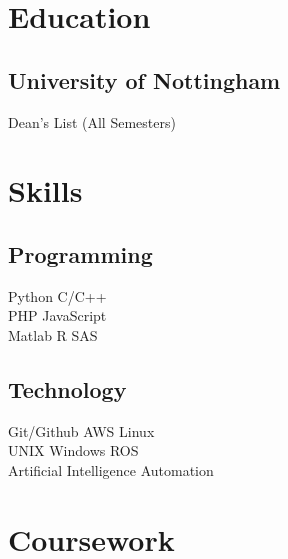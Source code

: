 \documentclass[]{deedy-resume-reversed}
\begin{document}
\hfill
\begin{minipage}[t]{0.33\textwidth}


\section{Education}

\subsection{University of Nottingham}
Dean's List (All Semesters) \\
\sectionsep


\section{Skills}
\subsection{Programming}
Python \textbullet{} C/C++ \\
PHP \textbullet{} JavaScript \\
Matlab \textbullet{} R \textbullet{} SAS \\
\sectionsep

\subsection{Technology}
Git/Github \textbullet{} AWS \textbullet{} Linux \\
UNIX \textbullet{} Windows \textbullet{} ROS \\
Artificial Intelligence \textbullet{} Automation \\
\sectionsep


\section{Coursework}
\sectionsep


\end{minipage}
\end{document}
